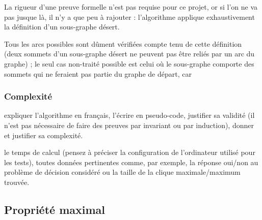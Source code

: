 La rigueur d'une preuve formelle n'est pas requise pour ce projet, or si l'on ne va  pas jusque là, il n'y a que peu à rajouter : l'algorithme applique exhaustivement la définition d'un sous-graphe désert. 

Tous les arcs  possibles sont dûment vérifiées compte tenu de cette définition (deux sommets d'un sous-graphe désert ne peuvent pas être reliés par un arc du graphe) ; le seul cas non-traité possible est celui où le sous-graphe comporte des sommets qui ne feraient pas partie du graphe de départ, car 

\subsubsection{Complexité}

    expliquer l'algorithme en français,
    l'écrire en pseudo-code,
    justifier sa validité (il n'est pas nécessaire de faire des preuves par invariant ou par induction),
    donner et justifier sa complexité.

    le temps de calcul (pensez à préciser la configuration de l'ordinateur utilisé pour les tests),
    toutes données pertinentes comme, par exemple, la réponse oui/non au problème de décision considéré ou la taille de la clique maximale/maximum trouvée.


\subsection{Propriété \og maximal \fg}